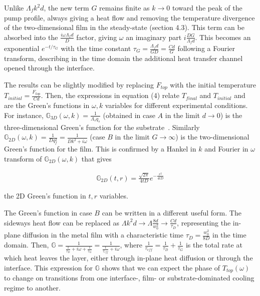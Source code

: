 \documentclass[5p]{elsarticle}
\begin{document}
Unlike $\Lambda_{f} k^{2}d$, the new term $G$ remains finite as $k\rightarrow 0$ toward the peak of the pump profile, always giving a heat flow and removing the temperature divergence of the two-dimensional film in the steady-state (section 4.3). This term can be absorbed into the $\frac{i\omega \Lambda_{f}d}{D}$ factor, giving $\omega$ an imaginary part $i\frac{DG}{\Lambda_{f} d}$. This becomes an exponential $e^{-t/\tau_{G}}$ with the time constant $\tau_{G}=\frac{\Lambda_{f} d}{GD}=\frac{Cd}{G}$ following a Fourier transform, describing in the time domain the additional heat transfer channel opened through the interface.

The results can be slightly modified by replacing $F_{top}$ with the initial temperature $T_{initial}=\frac{F_{top}}{Cd}$. Then, the expressions in equation (4) relate $T_{final}$ and $T_{initial}$ and are the Green's functions in $\omega,k$ variables for different experimental conditions. For instance, $\mathbb{G}_{3D}(\omega,k)=\frac{1}{\Lambda_{s}q_{s}}$ (obtained in case $A$ in the limit $d \rightarrow 0$) is the three-dimensional Green's function for the substrate~\cite{2004Cahill}. Similarly $\mathbb{G}_{2D}(\omega,k)=\frac{1}{Dq_{f}^{2}}=\frac{1}{Dk^{2}+i\omega}$ (case $B$ in the limit $G\rightarrow \infty$) is the two-dimensional Green's function for the film. This is confirmed by a Hankel in $k$ and Fourier in $\omega$ transform of $\mathbb{G}_{2D}(\omega,k)$ that gives

\begin{eqnarray}
\mathbb{G}_{2D}(t,r)=\frac{\sqrt{2\pi}}{4tD}e^{-\frac{r^{2}}{4tD}}
\end{eqnarray}

\noindent the 2D Green's function in $t,r$ variables.

The Green's function in case $B$ can be written in a different useful form. The sideways heat flow can be replaced as $\Lambda k^{2}d \rightarrow \Lambda \frac{8d}{w_{0}^{2}}\rightarrow \frac{Cd}{\tau_{D}}$, representing the in-plane diffusion in the metal film with a characteristic time $\tau_{D}=\frac{w_{0}^{2}}{8D}$ in the time domain. Then, $\mathbb{G}=\frac{1}{\frac{1}{\tau_{D}}+i\omega+\frac{1}{\tau_{G}}}=\frac{1}{\frac{1}{\tau_{eff}}+i\omega}$, where $\frac{1}{\tau_{eff}}=\frac{1}{\tau_{D}}+\frac{1}{\tau_{G}}$ is the total rate at which heat leaves the layer, either through in-plane heat diffusion or through the interface. This expression for $\mathbb{G}$ shows that we can expect the phase of $T_{top}(\omega)$ to change on transitions from one interface-, film- or substrate-dominated cooling regime to another.
\end{document}
